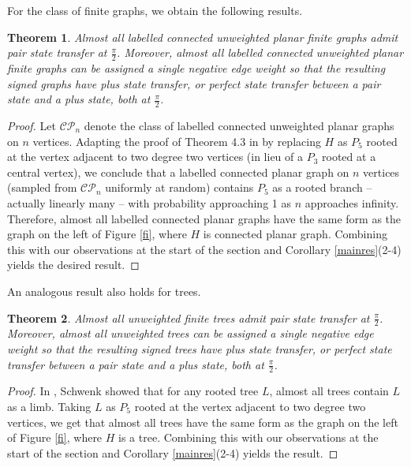 \documentclass[12pt,a4paper]{article}
\newtheorem{thm}{Theorem}
\begin{document}
For the class of finite graphs, we obtain the following results.

\begin{thm}
\label{almostallplanar}
Almost all labelled connected unweighted planar finite graphs admit pair state transfer at $\frac{\pi}{2}$. Moreover, almost all labelled connected unweighted planar finite graphs can be assigned a single negative edge weight so that the resulting signed graphs have plus state transfer, or perfect state transfer between a pair state and a plus state, both at $\frac{\pi}{2}$.
\end{thm}

\begin{proof}
Let $\mathcal{CP}_n$ denote the class of labelled connected unweighted planar graphs on $n$ vertices. Adapting the proof of Theorem 4.3 in \cite{ciardo2020braess} by replacing $H$ as $P_5$ rooted at the vertex adjacent to two degree two vertices (in lieu of a $P_3$ rooted at a central vertex), we conclude that a labelled connected planar graph on $n$ vertices (sampled from $\mathcal{CP}_n$ uniformly at random) contains $P_5$ as a rooted branch – actually linearly many – with probability approaching 1 as $n$ approaches infinity. Therefore, almost all labelled connected planar graphs have the same form as the graph on the left of Figure \ref{fi}, where $H$ is connected planar graph. Combining this with our observations at the start of the section and Corollary \ref{mainres}(2-4) yields the desired result.
\end{proof}

An analogous result also holds for trees. 

\begin{thm}
\label{almostalltrees}
Almost all unweighted finite trees admit pair state transfer at $\frac{\pi}{2}$. Moreover, almost all unweighted trees can be assigned a single negative edge weight so that the resulting signed trees have plus state transfer, or perfect state transfer between a pair state and a plus state, both at $\frac{\pi}{2}$.
\end{thm}

\begin{proof}
In \cite[Theorem 7]{schwenk1973almost}, Schwenk showed that for any rooted tree $L$, almost all trees contain $L$ as a limb. Taking $L$ as $P_5$ rooted at the vertex adjacent to two degree two vertices, we get that almost all trees have the same form as the graph on the left of Figure \ref{fi}, where $H$ is a tree. Combining this with our observations at the start of the section and Corollary \ref{mainres}(2-4) yields the result.   
\end{proof}
\end{document}
